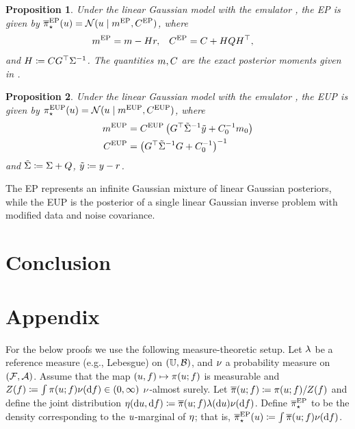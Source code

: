 \documentclass[12pt]{article}
\newtheorem{prop}{Proposition}
\begin{document}
\begin{prop}
Under the linear Gaussian model  with the emulator ,
the EP is given by ${\overline{\pi}}_{\star}^{\mathrm{EP}}(u) = \mathcal{N}(u \mid m^{\mathrm{EP}}, C^{\mathrm{EP}})$, where
\begin{align*}
m^{\mathrm{EP}} &= m - H r,
&&C^{\mathrm{EP}} = C + H Q H^\top,
\end{align*}
and $H \coloneqq C G^\top \Sigma^{-1}$. The quantities $m, C$ are the 
exact posterior moments given in .
\end{prop}

\begin{prop}
Under the linear Gaussian model  with the emulator ,
the EUP is given by ${\pi}_{\star}^{\mathrm{EUP}}(u) = \mathcal{N}(u \mid m^{\mathrm{EUP}}, C^{\mathrm{EUP}})$, where
\begin{align}
m^{\mathrm{EUP}} &= C^{\mathrm{EUP}} \left(G^\top \tilde{\Sigma}^{-1}\tilde{y} + C_0^{-1}m_0 \right) 
\label{eq:lin-Gauss-post-moments} \\
C^{\mathrm{EUP}} &= \left(G^\top \tilde{\Sigma}^{-1}G + C_0^{-1} \right)^{-1} \nonumber
\end{align}
and $\tilde{\Sigma} \coloneqq \Sigma + Q$, $\tilde{y} \coloneqq y - r$.
\end{prop}

The EP represents an infinite Gaussian mixture of linear Gaussian posteriors, while the EUP is the posterior
of a single linear Gaussian inverse problem with modified data and noise covariance.

\section{Conclusion} \label{sec:conclusion}





\section{Appendix}

For the below proofs we use the following measure-theoretic setup.
Let $\lambda$ be a reference measure (e.g., Lebesgue) on $(\mathbb{U}, \mathcal{B})$,
and $\nu$ a probability measure on $(\mathcal{F}, \mathcal{A})$. Assume that 
the map $(u, f) \mapsto \pi(u; f)$ is measurable
and $\normCst(\targetTraj) \Def \int \postDens(\Par; \targetTraj) \emDist(\d\targetTraj) \in (0,\infty)$
$\nu$-almost surely. Let $\overline{\pi}(u; f) \coloneqq \pi(u; f) / Z(f)$
and define the joint distribution 
$\emJoint(\d\Par, \d\targetTraj) \Def \postDensNorm(\Par; \targetTraj) \refMeas(\d\Par)\emDist(\d\targetTraj)$.
Define ${\overline{\pi}}_{\star}^{\mathrm{EP}}$ to be the density corresponding to the $u$-marginal of $\eta$; that is,
$\postApproxEP(\Par) \Def \int \postDensNorm(\Par; \targetTraj) \emDist(\d\targetTraj)$. 
\end{document}
